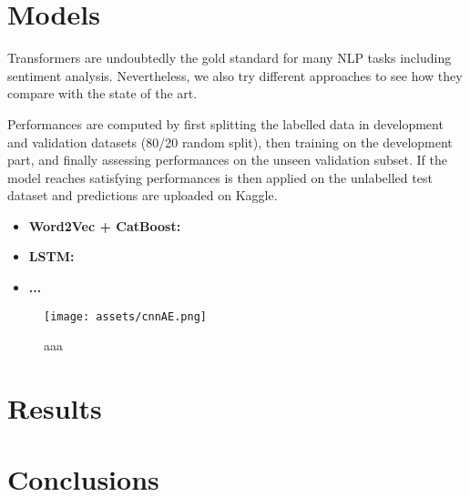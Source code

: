 \documentclass{article}
\begin{document}
\section{Models}
    Transformers are undoubtedly the gold standard for many NLP tasks including sentiment analysis. Nevertheless, we also try different approaches to see how they compare  with the state of the art.
    
    Performances are computed by first splitting the labelled data in development and validation datasets (80/20 random split), then training on the development part, and finally assessing performances on the unseen validation subset. If the model reaches satisfying performances is then applied on the unlabelled test dataset and predictions are uploaded on Kaggle.

	\begin{itemize}
		\item \textbf{Word2Vec + CatBoost:}
		\item \textbf{LSTM:}
		\item \textbf{...}
	\end{itemize}

  \begin{figure}
    \centering
    \texttt{[image: assets/cnnAE.png]}
    \caption{ aaa }
    \label{fig:cnnAE}
\end{figure}


\section{Results}

\section{Conclusions}

\printbibliography
\end{document}
